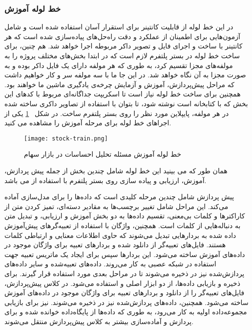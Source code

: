 \subsubsection{خط لوله آموزش}
در این خط لوله از قابلیت کانتینر برای استقرار آسان استفاده شده است و شامل آزمون‌هایی برای اطمینان از عملکرد و دقت راه‌حل‌های پیاده‌سازی شده است که هر کانتینر با ساخت و اجرای فایل و تصویر داکر مربوطه اجرا خواهد شد. هم چنین،‌ برای ساخت خط لوله در بستر پلتفرم لازم است که در ابتدا بخش‌های مختلف پروژه را به مولفه‌های مجزا تقسیم کرد، به طوری که هر مولفه دارای یک فایل داکر بوده و به صورت مجزا به آن نگاه خواهد شد. در این جا ما با سه مولفه سر و کار خواهیم داشت که مراحل پیش‌پردازش، آموزش و آزمایش چرخه‌ی یادگیری ماشین ما خواهند بود. همچنین برای ساخت خط لوله نیاز است تا اسکریپت جداگانه‌ای مربوط با کدهای این بخش که با کتابخانه  است نوشته شود، تا بتوان با استفاده از تصاویر داکری ساخته شده در هر مولفه، پایپلاین مورد نظر را روی بستر پلتفرم  ساخت. در شکل 
~\ref{fig: stock train}
یکی از اجراهای خط لوله  برای مرحله آموزش را مشاهده می کنید.
\begin{figure}[!t]
	\centering
	\texttt{[image: stock-train.png]}
	\caption{خط لوله آموزش مسئله تحلیل احساسات در بازار سهام}
	\label{fig: stock train}
\end{figure}

همان طور که می بینید این خط لوله شامل چندین بخش از جمله پیش پردازش،‌ آموزش،‌ ارزیابی و پیاده سازی روی بستر پلتفرم  با استفاده از  می باشد.


پیش پردازش شامل چندین مرحله کلیدی است که داده‌ها را برای مدل‌سازی آماده می‌کند. این مراحل شامل تغییر برچسب‌ها به مقادیر دسته‌ای، تمیز کردن متن از کاراکترها و کلمات بی‌معنی، تقسیم داده‌ها به دو بخش آموزش و ارزیابی، و تبدیل متن به دنباله‌هایی از کلمات است.  همچنین، واژگان با استفاده از تعبیه‌گرهای پیش‌آموزش داده شده  به بردارهایی تبدیل می‌شوند که حاوی اطلاعات معنایی و ارتباطی کلمات هستند. فایل‌های تعبیه‌گر  از  دانلود شده و بردارهای تعبیه برای واژگان موجود در داده‌های آموزش ساخته می‌شود. این بردارها سپس برای ایجاد یک ماتریس تعبیه جهت استفاده در شبکه عصبی به کار می‌روند. داده‌های تعبیه‌شده و سایر داده‌های پردازش‌شده نیز در  ذخیره می‌شوند تا در مراحل بعدی مورد استفاده قرار گیرند. برای ذخیره و بازیابی داده‌ها، از دو ابزار اصلی  و  استفاده می‌شود. در کلاس پیش‌پردازش، فایل‌های تعبیه‌گر  را از  دانلود و بردارهای تعبیه برای واژگان موجود در داده‌های آموزش ساخته می‌شود. همچنین، داده‌های پردازش‌شده نیز در  ذخیره می‌شوند.  نیز برای بازیابی مجموعه‌داده اولیه به کار می‌رود، به طوری که داده‌ها از پایگاه‌داده خوانده شده و برای پردازش و آماده‌سازی بیشتر به کلاس پیش‌پردازش منتقل می‌شوند. 


